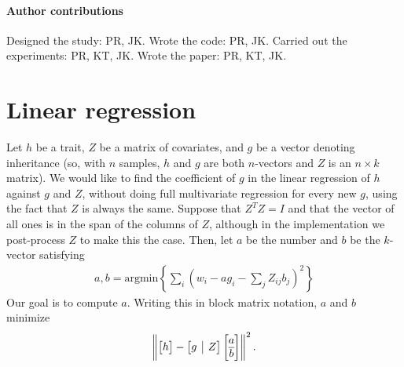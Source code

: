 \documentclass[9pt,twoside,lineno]{gsajnl}
\begin{document}
\paragraph{Author contributions}
Designed the study: PR, JK. Wrote the code: PR, JK. Carried out the experiments: PR, KT, JK. Wrote the paper: PR, KT, JK.



\clearpage
\appendix
\setcounter{table}{0}
\renewcommand{\thetable}{S\arabic{table}}
\setcounter{figure}{0}
\renewcommand{\thefigure}{S\arabic{figure}}




\appendix

\section{Linear regression}
\label{apx:regression}

Let $h$ be a trait, $Z$ be a matrix of covariates, and $g$ be a vector denoting inheritance
(so, with $n$ samples, $h$ and $g$ are both $n$-vectors and $Z$ is an $n \times k$ matrix).
We would like to find the coefficient of $g$ in the linear regression of $h$ against $g$ and $Z$,
without doing full multivariate regression for every new $g$,
using the fact that $Z$ is always the same.
Suppose that $Z^T Z = I$ and that the vector of all ones is in the span of the columns of $Z$,
although in the implementation we post-process $Z$ to make this the case.
Then, let $a$ be the number and $b$ be the $k$-vector satisfying
\begin{align*}
    a, b = \text{argmin}\left\{ \sum_i \left( w_i - a g_i - \sum_j Z_{ij} b_j \right)^2 \right\}
\end{align*}
Our goal is to compute $a$.
Writing this in block matrix notation, $a$ and $b$ minimize
\begin{align*}
    \left\|
        \left[ \begin{array}{@{}c@{}} h \end{array}\right]
            -
        \left[ \begin{array}{@{}c|c@{}} g & Z \end{array} \right]
            \left[ \begin{array}{@{}c@{}} a \\ \hline b \end{array} \right]
    \right\|^2 .
\end{align*}
\end{document}
